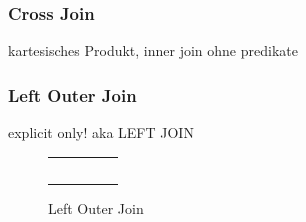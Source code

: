 \documentclass[a4paper]{article}
\begin{document}
\subsubsection{Cross Join}
kartesisches Produkt, inner join ohne predikate

\subsubsection{Left Outer Join}
explicit only!
aka LEFT JOIN

\begin{figure}[H]
\centering
{}
\end{figure}

\begin{figure}[H]
\centering
  \begin{tabular}{| c | c | c | c | c |}
    \hline
    \cellcolor{cell} & \cellcolor{cell} & \cellcolor{cell} &  \cellcolor{cell-odd} & \cellcolor{cell-odd} \\ \hline
    \cellcolor{cell} & \cellcolor{cell} & \cellcolor{cell} &  \cellcolor{cell-odd} & \cellcolor{cell-odd} \\ \hline
    \cellcolor{cell} & \cellcolor{cell} & \cellcolor{cell} &  \cellcolor{cell-odd} & \cellcolor{cell-odd} \\ \hline
    \cellcolor{cell} & \cellcolor{cell} & \cellcolor{cell} &  \cellcolor{cell-odd} & \cellcolor{cell-odd} \\ \hline
    \cellcolor{cell} & \cellcolor{cell} & \cellcolor{cell} &  \cellcolor{cell-odd} & \cellcolor{cell-odd} \\ \hline
    \cellcolor{cell} & \cellcolor{cell} & \cellcolor{cell} & & \\ \hline
  \end{tabular}
\caption{Left Outer Join}
\end{figure}
\end{document}
